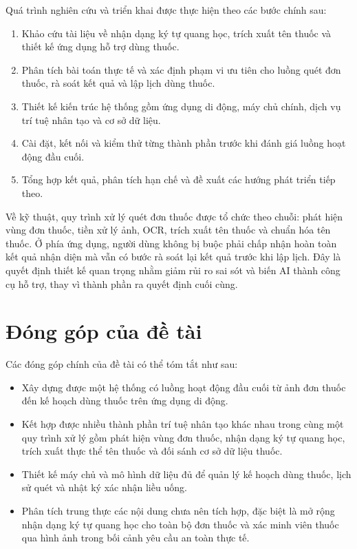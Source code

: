 \documentclass[12pt,a4paper]{report}
\begin{document}
Quá trình nghiên cứu và triển khai được thực hiện theo các bước chính sau:

\begin{enumerate}[label=\arabic*.]
    \item Khảo cứu tài liệu về nhận dạng ký tự quang học, trích xuất tên thuốc và thiết kế ứng dụng hỗ trợ dùng thuốc.
    \item Phân tích bài toán thực tế và xác định phạm vi ưu tiên cho luồng quét đơn thuốc, rà soát kết quả và lập lịch dùng thuốc.
    \item Thiết kế kiến trúc hệ thống gồm ứng dụng di động, máy chủ chính, dịch vụ trí tuệ nhân tạo và cơ sở dữ liệu.
    \item Cài đặt, kết nối và kiểm thử từng thành phần trước khi đánh giá luồng hoạt động đầu cuối.
    \item Tổng hợp kết quả, phân tích hạn chế và đề xuất các hướng phát triển tiếp theo.
\end{enumerate}

Về kỹ thuật, quy trình xử lý quét đơn thuốc được tổ chức theo chuỗi: phát hiện vùng đơn thuốc, tiền xử lý ảnh, OCR, trích xuất tên thuốc và chuẩn hóa tên thuốc. Ở phía ứng dụng, người dùng không bị buộc phải chấp nhận hoàn toàn kết quả nhận diện mà vẫn có bước rà soát lại kết quả trước khi lập lịch. Đây là quyết định thiết kế quan trọng nhằm giảm rủi ro sai sót và biến AI thành công cụ hỗ trợ, thay vì thành phần ra quyết định cuối cùng.

\section{Đóng góp của đề tài}

Các đóng góp chính của đề tài có thể tóm tắt như sau:

\begin{itemize}[leftmargin=1.5cm]
    \item Xây dựng được một hệ thống có luồng hoạt động đầu cuối từ ảnh đơn thuốc đến kế hoạch dùng thuốc trên ứng dụng di động.
    \item Kết hợp được nhiều thành phần trí tuệ nhân tạo khác nhau trong cùng một quy trình xử lý gồm phát hiện vùng đơn thuốc, nhận dạng ký tự quang học, trích xuất thực thể tên thuốc và đối sánh cơ sở dữ liệu thuốc.
    \item Thiết kế máy chủ và mô hình dữ liệu đủ để quản lý kế hoạch dùng thuốc, lịch sử quét và nhật ký xác nhận liều uống.
    \item Phân tích trung thực các nội dung chưa nên tích hợp, đặc biệt là mở rộng nhận dạng ký tự quang học cho toàn bộ đơn thuốc và xác minh viên thuốc qua hình ảnh trong bối cảnh yêu cầu an toàn thực tế.
\end{itemize}
\end{document}
